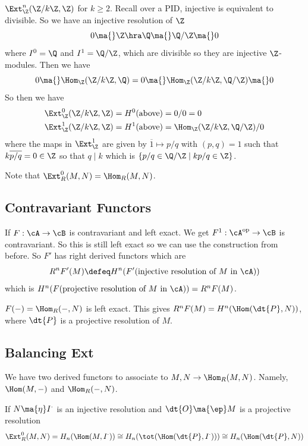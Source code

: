 \begin{ex}
$\Ext_{\Z}^n(\Z/k\Z,\Z)$ for $k \geq 2$. Recall over a PID, injective is equivalent to divisible. So we have an injective resolution of $\Z$
\[
0 \ma{} \Z \hra \Q \ma{} \Q/\Z \ma{} 0
\]
where $I^0=\Q$ and $I^1=\Q/\Z$, which are divisible so they are injective $\Z$-modules. Then we have
\[
0 \ma{} \Hom_{\Z}(\Z/k\Z,\Q)=0 \ma{} \Hom_{\Z}(\Z/k\Z,\Q/\Z) \ma{} 0
\]
So then we have
\[
\begin{split}
\Ext^0_{\Z}(\Z/k\Z,\Z) &= H^0(\text{above})=0/0=0 \\
\Ext^1_{\Z}(\Z/k\Z,\Z) &= H^1(\text{above})=\Hom_{\Z}(\Z/k\Z,\Q/\Z)/0
\end{split}
\]
where the maps in $\Ext_{\Z}^1$ are given by $\overline{1} \mapsto p/q$ with $(p,q)=1$ such that $k \overline{p/q}=0 \in \Z$ so that $q \mid k$ which is $\{p/q \in \Q/\Z \;|\; kp/q \in \Z\}$. 
\end{ex}

Note that $\Ext_R^0(M,N)=\Hom_R(M,N)$.

\subsection{Contravariant Functors}

If $F: \cA \to \cB$ is contravariant and left exact. We get $F^1: \cA^{\text{op}} \to \cB$ is contravariant. So this is still left exact so we can use the construction from before. So $F'$ has right derived functors which are 
\[
R^nF'(M) \defeq H^n(F'(\text{injective resolution of }M \text{ in }\cA))
\]
which is $H^n(F(\text{projective resolution of }M\text{ in }\cA))=R^nF(M)$. 

\begin{ex}
$F(-)=\Hom_R(-,N)$ is left exact. This gives $R^nF(M)=H^n(\Hom(\dt{P},N))$, where $\dt{P}$ is a projective resolution of $M$. 
\end{ex}

\subsection{Balancing Ext}

We have two derived functors to associate to $M,N \to \Hom_R(M,N)$. Namely, $\Hom(M,-)$ and $\Hom_R(-,N)$. 

\begin{thm}
If $N \ma{\eta} I^{\cdot}$ is an injective resolution and $\dt{O} \ma{\ep} M$ is a projective resolution
\[
\Ext_R^0(M,N)=H_n(\Hom(M,I^{\cdot})) \cong H_n(\tot(\Hom(\dt{P},I^{\cdot}))) \cong H_n(\Hom(\dt{P},N))
\]
\end{thm}

